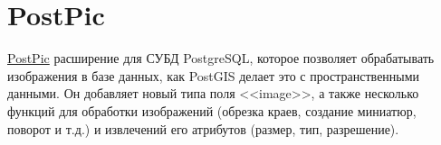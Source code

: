 \section{PostPic}

\href{http://drotiro.github.io/postpic/}{PostPic} расширение для СУБД PostgreSQL, которое позволяет обрабатывать изображения в базе данных, как PostGIS делает это с пространственными данными. Он добавляет новый типа поля <<image>>, а также несколько функций для обработки изображений (обрезка краев, создание миниатюр, поворот и т.д.) и извлечений его атрибутов (размер, тип, разрешение).